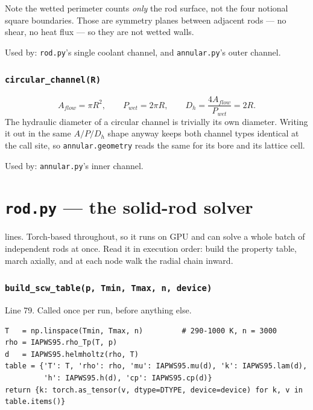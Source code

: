 \documentclass[11pt]{article}
\newcommand{\code}[1]{\texttt{#1}}
\begin{document}
Note the wetted perimeter counts \emph{only} the rod surface, not the four notional
square boundaries. Those are symmetry planes between adjacent rods --- no shear, no heat
flux --- so they are not wetted walls.

Used by: \code{rod.py}'s single coolant channel, and \code{annular.py}'s outer channel.

\section{\code{circular\_channel(R)}}
\begin{equation}
A_{flow} = \pi R^2, \qquad P_{wet} = 2\pi R, \qquad D_h = \frac{4A_{flow}}{P_{wet}} = 2R.
\end{equation}
The hydraulic diameter of a circular channel is trivially its own diameter. Writing it
out in the same $A/P/D_h$ shape anyway keeps both channel types identical at the call
site, so \code{annular.geometry} reads the same for its bore and its lattice cell.

Used by: \code{annular.py}'s inner channel.

\newpage
\part{\code{rod.py} --- the solid-rod solver}

 lines. Torch-based throughout, so it runs on GPU and can solve a whole batch of
independent rods at once. Read it in execution order: build the property table, march
axially, and at each node walk the radial chain inward.

\section{\code{build\_scw\_table(p, Tmin, Tmax, n, device)}}
\label{sec:scwtable}
Line 79. Called once per run, before anything else.

\begin{lstlisting}
T   = np.linspace(Tmin, Tmax, n)         # 290-1000 K, n = 3000
rho = IAPWS95.rho_Tp(T, p)
d   = IAPWS95.helmholtz(rho, T)
table = {'T': T, 'rho': rho, 'mu': IAPWS95.mu(d), 'k': IAPWS95.lam(d),
         'h': IAPWS95.h(d), 'cp': IAPWS95.cp(d)}
return {k: torch.as_tensor(v, dtype=DTYPE, device=device) for k, v in table.items()}
\end{lstlisting}
\end{document}

